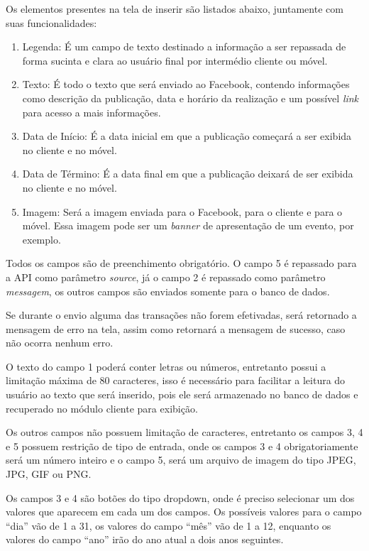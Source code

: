 Os elementos presentes na tela de inserir são listados abaixo, juntamente com suas funcionalidades: 

\begin{enumerate}
   \item Legenda: É um campo de texto destinado a informação a ser repassada de forma sucinta e clara ao usuário final por intermédio cliente ou móvel. 
   \item Texto: É todo o texto que será enviado ao Facebook, contendo informações como descrição da publicação, data e horário da realização e um possível \textit{link} para acesso a mais informações. 
   \item Data de Início: É a data inicial em que a publicação começará a ser exibida no cliente e no móvel.
   \item Data de Término: É a data final em que a publicação deixará de ser exibida no cliente e no móvel.
   \item Imagem: Será a imagem enviada para o Facebook, para o cliente e para o móvel. Essa imagem pode ser um \textit{banner} de apresentação de um evento, por exemplo.
 \end{enumerate}

Todos os campos são de preenchimento obrigatório. O campo 5 é repassado para a API como parâmetro \textit{source}, já o campo 2 é repassado como parâmetro \textit{messagem}, os outros campos são enviados somente para o banco de dados.

Se durante o envio alguma das transações não forem efetivadas, será retornado a mensagem de erro na tela, assim como retornará a mensagem de sucesso, caso não ocorra nenhum erro.

O texto do campo 1 poderá conter letras ou números, entretanto possui a limitação máxima de 80 caracteres, isso é necessário para facilitar a leitura do usuário ao texto que será inserido, pois ele será armazenado no banco de dados e recuperado no módulo cliente para exibição.

Os outros campos não possuem limitação de caracteres, entretanto os campos 3, 4 e 5 possuem restrição de tipo de entrada, onde os campos 3 e 4 obrigatoriamente será um número inteiro e o campo 5, será um arquivo de imagem do tipo JPEG, JPG, GIF ou PNG.

Os campos 3 e 4 são botões do tipo dropdown, onde é preciso selecionar um dos valores que aparecem em cada um dos campos. Os possíveis valores para o campo ``dia'' vão de 1 a 31, os valores do campo ``mês'' vão de 1 a 12, enquanto os valores do campo ``ano'' irão do ano atual a dois anos seguintes.

